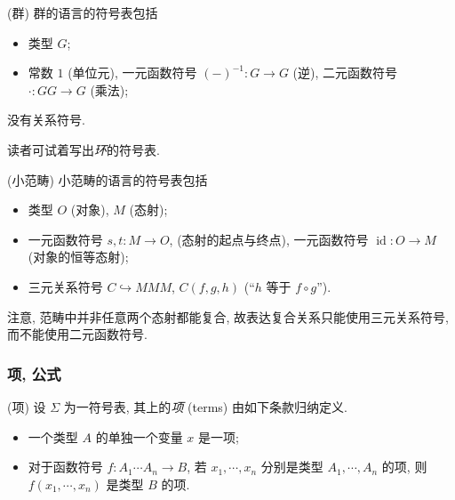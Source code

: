 \begin{example}
	[label={group-language}]
	{(群)}
	群的语言的符号表包括
	\begin{itemize}
		\item 类型 $G$;
		\item 常数 $1$ (单位元), 一元函数符号 $(-)^{-1}\colon G\to G$ (逆), 二元函数符号 $\cdot\colon GG \to G$ (乘法);
	\end{itemize}
	没有关系符号\footnotemark.
	
	读者可试着写出\emph{环}的符号表.
\end{example}


\begin{example}
	[label={small-category-language}]
	{(小范畴)}
	小范畴的语言的符号表包括
	\begin{itemize}
		\item 类型 $O$ (对象), $M$ (态射);
		\item 一元函数符号 $s,t\colon M\to O$,
		(态射的起点与终点), 一元函数符号 $\operatorname{id}\colon O\to M$
		(对象的恒等态射);
		\item 三元关系符号 $C\hookrightarrow MMM$,
		$C(f,g,h)$ (``$h$ 等于 $f\circ g$'').
	\end{itemize}
	注意, 范畴中并非任意两个态射都能复合, 故表达复合关系只能使用三元关系符号, 而不能使用二元函数符号.
\end{example}

\subsubsection{项, 公式}

\begin{definition}
	{(项)}
	设 $\Sigma$ 为一符号表, 其上的\emph{项} (terms) 由如下条款归纳定义.
	\begin{itemize}
		\item 一个类型 $A$ 的单独一个变量 $x$ 是一项;
		\item 对于函数符号 $f \colon A_1\cdots A_n \to B$, 若 $x_1,\cdots,x_n$ 分别是类型 $A_1,\cdots,A_n$ 的项, 则 $f(x_1,\cdots,x_n)$ 是类型 $B$ 的项.
	\end{itemize}
\end{definition}

